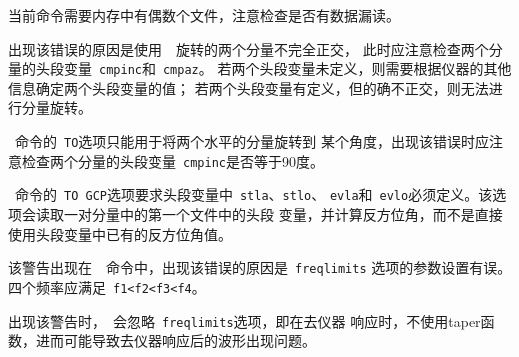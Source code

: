 当前命令需要内存中有偶数个文件，注意检查是否有数据漏读。

出现该错误的原因是使用~~旋转的两个分量不完全正交，
此时应注意检查两个分量的头段变量~\verb+cmpinc+和~\verb+cmpaz+。
若两个头段变量未定义，则需要根据仪器的其他信息确定两个头段变量的值；
若两个头段变量有定义，但的确不正交，则无法进行分量旋转。

~命令的~\verb+TO+选项只能用于将两个水平的分量旋转到
某个角度，出现该错误时应注意检查两个分量的头段变量~\verb+cmpinc+是否等于90度。

~命令的~\verb+TO GCP+选项要求头段变量中~\verb+stla+、\verb+stlo+、
\verb+evla+和~\verb+evlo+必须定义。该选项会读取一对分量中的第一个文件中的头段
变量，并计算反方位角，而不是直接使用头段变量中已有的反方位角值。

该警告出现在~~命令中，出现该错误的原因是~\verb+freqlimits+
选项的参数设置有误。四个频率应满足~\verb+f1<f2<f3<f4+。

出现该警告时，~会忽略~\verb+freqlimits+选项，即在去仪器
响应时，不使用taper函数，进而可能导致去仪器响应后的波形出现问题。
